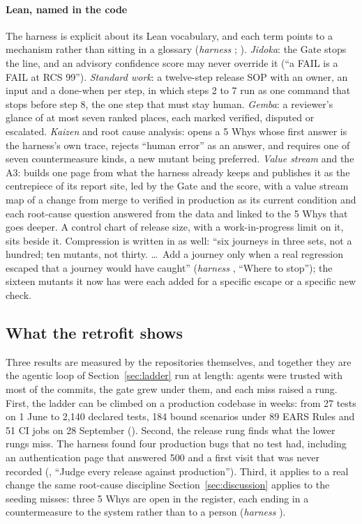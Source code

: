 \paragraph{Lean, named in the code} The harness is explicit about its Lean vocabulary, and each
term points to a mechanism rather than sitting in a glossary (\emph{harness} ;
). \emph{Jidoka}: the Gate stops the line, and an advisory confidence score
may never override it (``a FAIL is a FAIL at RCS 99''). \emph{Standard work}: a twelve-step
release SOP with an owner, an input and a done-when per step, in which steps 2 to 7 run as one
command that stops before step 8, the one step that must stay human. \emph{Gemba}: a reviewer's
glance of at most seven ranked places, each marked verified, disputed or escalated.
\emph{Kaizen} and root cause analysis:  opens a 5 Whys whose first answer is
the harness's own trace, rejects ``human error'' as an answer, and requires one of seven
countermeasure kinds, a new mutant being preferred. \emph{Value stream} and the A3:
 builds one page from what the harness already keeps and publishes it as the
centrepiece of its report site, led by the Gate and the score, with a value stream map of a
change from merge to verified in production as its current condition and each root-cause
question answered from the data and linked to the 5 Whys that goes deeper. A control chart of
release size, with a work-in-progress limit on it, sits beside it. Compression is written in as
well: ``six journeys in three sets, not a hundred; ten mutants, not thirty. \ldots\ Add a
journey only when a real regression escaped that a journey would have caught'' (\emph{harness}
, ``Where to stop''); the sixteen mutants it now has were each added for a
specific escape or a specific new check.

\subsection{What the retrofit shows}

Three results are measured by the repositories themselves, and together they are the agentic
loop of Section~\ref{sec:ladder} run at length: agents were trusted with most of the commits,
the gate grew under them, and each miss raised a rung. First, the ladder can be climbed on a
production codebase in weeks: from 27 tests on 1 June to 2,140 declared tests, 184 bound scenarios
under 89 EARS Rules and 51 CI jobs on 28 September (). Second, the release rung
finds what the lower rungs miss. The harness found four production bugs that no test had,
including an authentication page that answered 500 and a first visit that was never recorded
(, ``Judge every release against production''). Third, it applies to a real
change the same root-cause discipline Section~\ref{sec:discussion} applies to the seeding misses:
three 5 Whys are open in the register, each ending in a countermeasure to the system rather than
to a person (\emph{harness} ).

